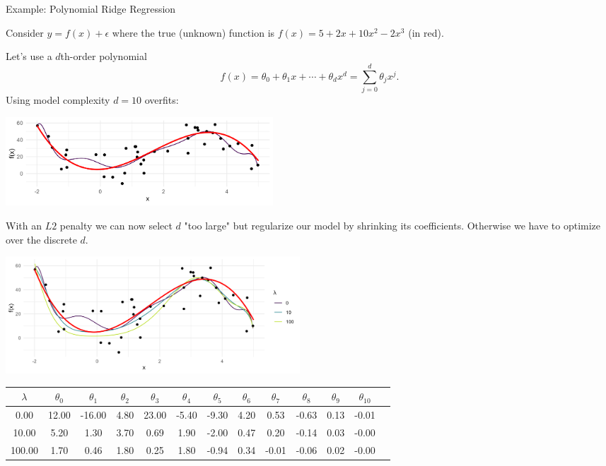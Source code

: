 \documentclass[11pt,compress,t,notes=noshow, xcolor=table]{beamer}
\begin{document}
\begin{vbframe}{Example: Polynomial Ridge Regression}

Consider $y=f(x)+\epsilon$ where the true (unknown) function is \(f(x) = 5 + 2x +10x^2 - 2x^3\) (in red).

\lz

Let's use a \(d\)th-order polynomial
\[ f(x) = \theta_0 + \theta_1 x + \cdots + \theta_d x^d = \sum_{j = 0}^{d} \theta_j x^j\text{.} \]
Using model complexity $d = 10$ overfits:

\begin{center}
\includegraphics[width = 10cm ]{figure/poly_ridge_01.png} \\
\end{center}

\framebreak

With an $L2$ penalty we can now select $d$ "too large" but regularize our model by shrinking its coefficients. Otherwise we have to optimize over the discrete $d$.

\vfill

\begin{center}
\includegraphics[width = 11cm ]{figure/poly_ridge_02.png} \\
\end{center}


\begin{center}
\tiny
\begin{tabular}{ c| c c c c c c c c c c c c}
 $\lambda$ & $\theta_0$ & $\theta_1$ & $\theta_2$ & $\theta_3$ & $\theta_4$ & $\theta_5$ & $\theta_6$ & $\theta_7$ & $\theta_8$ & $\theta_9$ & $\theta_{10}$ \\ 
 \hline
 0.00 & 12.00 & -16.00 & 4.80 & 23.00 & -5.40 & -9.30 & 4.20 & 0.53 & -0.63 & 0.13 & -0.01 \\  
 10.00 & 5.20 &1.30 & 3.70 & 0.69 & 1.90 & -2.00 & 0.47 & 0.20 & -0.14 & 0.03 & -0.00 \\ 
 100.00 & 1.70 & 0.46 & 1.80 & 0.25 & 1.80 & -0.94 & 0.34 & -0.01 & -0.06 & 0.02 & -0.00
\end{tabular}
\end{center}


\end{vbframe}
\end{document}
